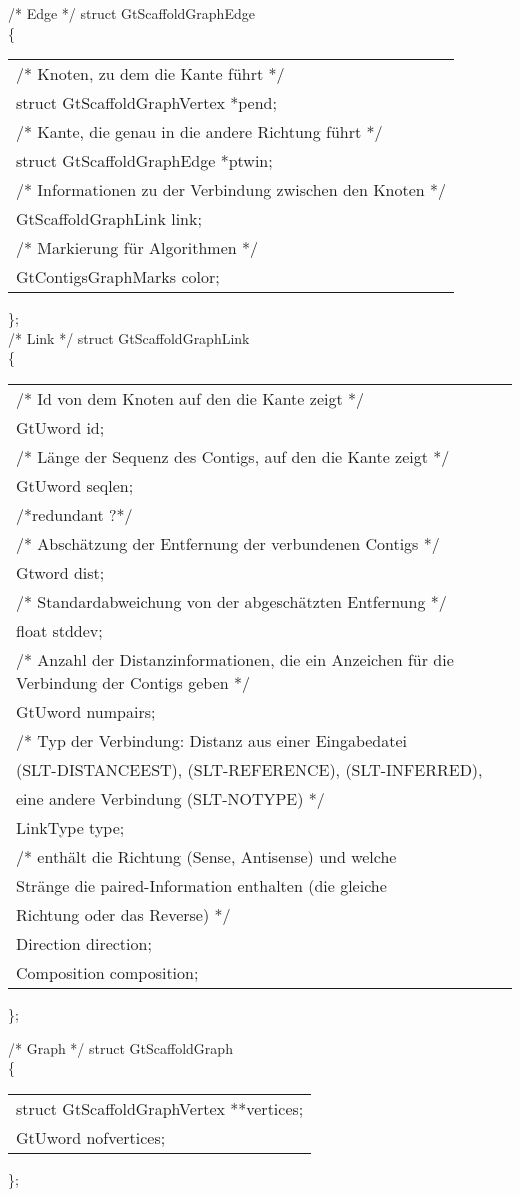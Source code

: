 \documentclass[a4paper,10pt,parskip]{scrartcl}
\begin{document}
/* Edge */
struct GtScaffoldGraphEdge\\
\{\\
\begin{tabular}{l}
  /*  Knoten, zu dem die Kante führt */\\
  struct GtScaffoldGraphVertex *pend;\\ 
  /* Kante, die genau in die andere Richtung führt */\\
  struct GtScaffoldGraphEdge *ptwin;\\ 
  /* Informationen zu der Verbindung zwischen den Knoten */\\
  GtScaffoldGraphLink link;\\ 
  /* Markierung für Algorithmen */\\
  GtContigsGraphMarks color;\\ 
\end{tabular}
\};\\

/* Link */
struct GtScaffoldGraphLink\\
\{\\
\begin{tabular}{l}
  /* Id von dem Knoten auf den die Kante zeigt */\\
  GtUword id;\\ 	
  /* Länge der Sequenz des Contigs, auf den die Kante zeigt */\\
  GtUword seqlen;\\ 
  /*redundant ?*/\\

  /* Abschätzung der Entfernung der verbundenen Contigs */\\
  Gtword dist;\\
  /* Standardabweichung von der abgeschätzten Entfernung */\\
  float stddev;\\
  /* Anzahl der Distanzinformationen, die ein Anzeichen für die
  Verbindung der Contigs geben */\\
  GtUword numpairs;\\
  /* Typ der Verbindung: Distanz aus einer Eingabedatei\\
     (SLT-DISTANCEEST), (SLT-REFERENCE), (SLT-INFERRED),\\
     eine andere Verbindung (SLT-NOTYPE) */\\	    
  LinkType type;\\
  /* enthält die Richtung (Sense, Antisense) und welche\\
     Stränge die paired-Information enthalten (die gleiche\\
     Richtung oder das Reverse) */\\
  Direction direction;\\
  Composition composition;
\end{tabular}
\};

/* Graph */
struct GtScaffoldGraph\\
\{\\
\begin{tabular}{l}
  struct GtScaffoldGraphVertex **vertices;\\
  GtUword nofvertices;
\end{tabular}
\};
\end{document}
